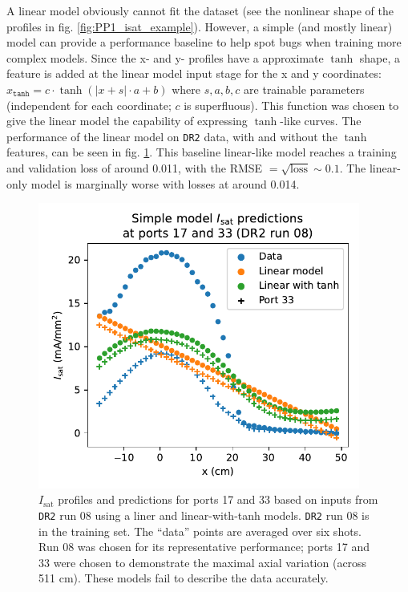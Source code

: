 A linear model obviously cannot fit the dataset (see the nonlinear shape of the profiles in fig. \ref{fig:PP1_isat_example}). However, a simple (and mostly linear) model can provide a performance baseline to help spot bugs when training more complex models. Since the x- and y- profiles have a approximate $\tanh$ shape, a feature is added at the linear model input stage for the x and y coordinates: $x_\texttt{tanh} = c \cdot \tanh\left(\left|x + s\right| \cdot a + b \right)$ where $s, a, b, c$ are trainable parameters (independent for each coordinate; $c$ is superfluous). This function was chosen to give the linear model the capability of expressing $\tanh$-like curves. The performance of the linear model on \texttt{DR2} data, with and without the $\tanh$ features, can be seen in fig. \ref{fig:PP1_linear_simple_data}. This baseline linear-like model reaches a training and validation loss of around 0.011, with the RMSE $=\sqrt{\text{loss}} \sim 0.1$. The linear-only model is marginally worse with losses at around 0.014.

\begin{figure}
	\centering
	\includegraphics[width=300pt]{figures/PP1_linear_simple_vs_data.pdf}
	\caption[size=12]{\label{fig:PP1_linear_simple_data}$I_\text{sat}$ profiles and predictions for ports 17 and 33 based on inputs from \texttt{DR2} run 08 using a liner and linear-with-tanh models. \texttt{DR2} run 08 is in the training set. The ``data'' points are averaged over six shots. Run 08 was chosen for its representative performance; ports 17 and 33 were chosen to demonstrate the maximal axial variation (across 511 cm). These models fail to describe the data accurately.}
\end{figure}

